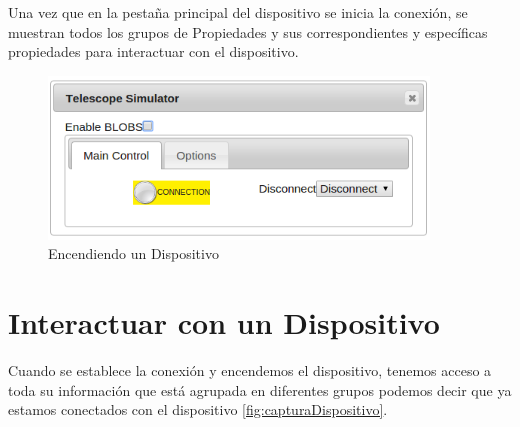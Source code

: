 Una vez que en la pestaña principal del dispositivo se inicia la conexión, se muestran todos los grupos de Propiedades y sus correspondientes y específicas propiedades para interactuar con el dispositivo.
\begin{figure}[htb]
\centering
\includegraphics[width=0.9\textwidth]{./imagenes/capturaEncendiendo}
\caption{Encendiendo un Dispositivo} \label{fig:encendiendoDispositivo}
\end{figure}

\section{Interactuar con un Dispositivo}
Cuando se establece la conexión y encendemos el dispositivo, tenemos acceso a toda su información  que está agrupada en diferentes grupos podemos decir que ya estamos conectados con el dispositivo \ref{fig:capturaDispositivo}.\\

